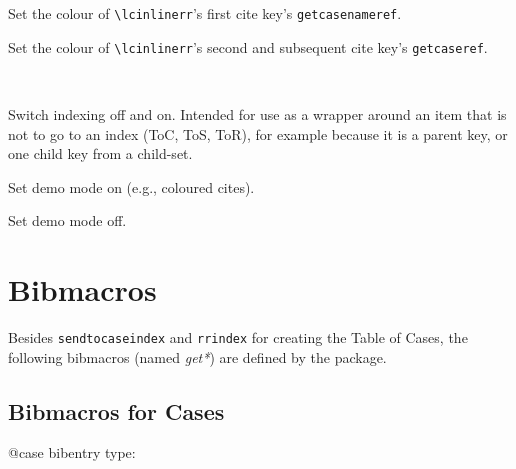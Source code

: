 
Set the colour of \texttt{\textbackslash lcinlinerr}'s first cite key's \colorbox{red!10}{\texttt{getcasenameref}}. %
\bigskip
	

Set the colour of \texttt{\textbackslash lcinlinerr}'s second and subsequent cite key's \colorbox{yellow!20}{\texttt{getcaseref}}.
\bigskip

 \\

Switch indexing off and on. Intended for use as a wrapper around an item that is not to go to an index (ToC, ToS, ToR), for example because it is a parent key, or one child key from a child-set.
\bigskip


	


Set demo mode on (e.g., coloured cites).
\bigskip


Set demo mode off.
\bigskip

	
	
	
	
	
	
	
	
\section{Bibmacros}
Besides \texttt{sendtocaseindex} and \texttt{rrindex} for creating the Table of Cases, the following bibmacros (named \textit{get*}) are defined by the package.


\subsection{Bibmacros for Cases}
@case bibentry type:

